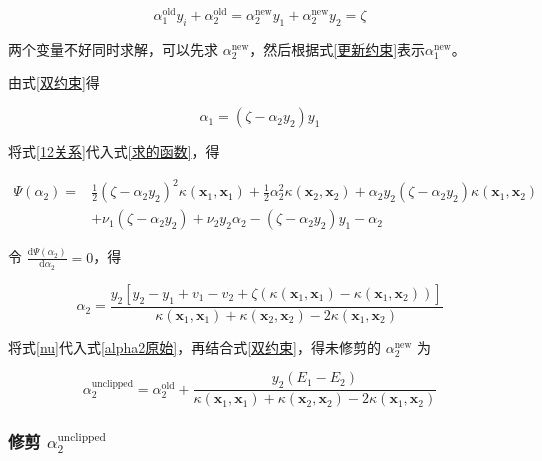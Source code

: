 \documentclass{ctexart}
\begin{document}
	\begin{equation}
		\alpha_{1}^\text{old}y_i+\alpha_{2}^\text{old}=\alpha_{2}^\text{new}y_1+\alpha_{2}^\text{new}y_2=\zeta
		\label{更新约束}
	\end{equation}
	
	两个变量不好同时求解，可以先求 $\alpha_{2}^\text{new}$，然后根据式\eqref{更新约束}表示$\alpha_{1}^\text{new}$。
	
	由式\eqref{双约束}得
	
	\begin{equation}
		\alpha_{1}=(\zeta-\alpha_2y_2)y_1
		\label{12关系}
	\end{equation}

	将式\eqref{12关系}代入式\eqref{求的函数}，得
	
	\begin{equation}
		\begin{aligned}
			\Psi(\alpha_{2})=&\frac{1}{2}(\zeta-\alpha_{2}y_2)^2\kappa(\boldsymbol{x}_1,\boldsymbol{x}_1)+\frac{1}{2}\alpha_{2}^2\kappa(\boldsymbol{x}_2,\boldsymbol{x}_2)+\alpha_{2}y_2(\zeta-\alpha_{2}y_2)\kappa(\boldsymbol{x}_1,\boldsymbol{x}_2)\\
			&+\nu_1(\zeta-\alpha_{2}y_2)+\nu_2y_2\alpha_{2}-(\zeta-\alpha_{2}y_2)y_1-\alpha_{2}
		\end{aligned}
	\end{equation}
	
	令 $\frac{\mathrm{d}\Psi(\alpha_{2})}{\mathrm{d}\alpha_{2}}=0$，得
	
	\begin{equation}
		\alpha_{2}=\frac{y_2[y_2-y_1+v_1-v_2+\zeta(\kappa(\boldsymbol{x}_1,\boldsymbol{x}_1)-\kappa(\boldsymbol{x}_1,\boldsymbol{x}_2))]}{\kappa(\boldsymbol{x}_1,\boldsymbol{x}_1)+\kappa(\boldsymbol{x}_2,\boldsymbol{x}_2)-2\kappa(\boldsymbol{x}_1,\boldsymbol{x}_2)}
		\label{alpha2原始}
	\end{equation}

	将式\eqref{nu}代入式\eqref{alpha2原始}，再结合式\eqref{双约束}，得未修剪的 $\alpha_{2}^\text{new}$ 为
	
	\begin{equation}
		\alpha_{2}^{\text{unclipped}}=\alpha_{2}^\text{old}+\frac{y_2(E_1-E_2)}{\kappa(\boldsymbol{x}_1,\boldsymbol{x}_1)+\kappa(\boldsymbol{x}_2,\boldsymbol{x}_2)-2\kappa(\boldsymbol{x}_1,\boldsymbol{x}_2)}
		\label{未修剪}
	\end{equation}

	\subsubsection{修剪 $\alpha_{2}^{\operatorname{unclipped}}$}
	
\end{document}
